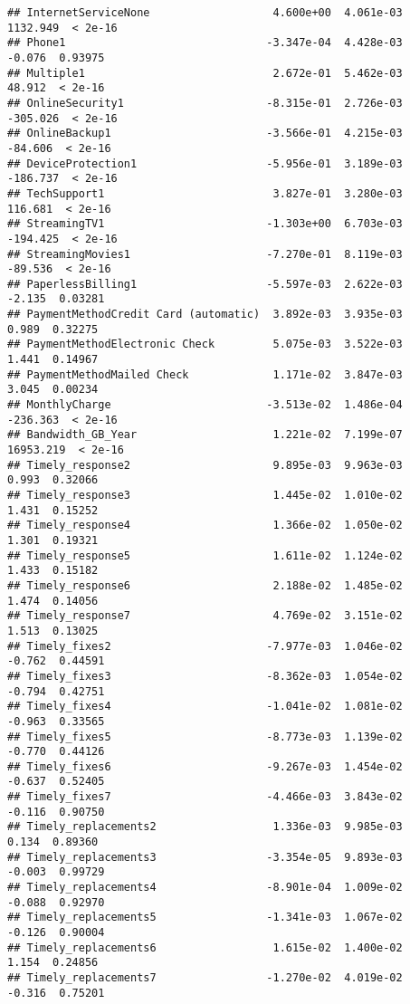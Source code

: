 \documentclass[
]{article}
\begin{document}
\begin{verbatim}
## InternetServiceNone                   4.600e+00  4.061e-03  1132.949  < 2e-16
## Phone1                               -3.347e-04  4.428e-03    -0.076  0.93975
## Multiple1                             2.672e-01  5.462e-03    48.912  < 2e-16
## OnlineSecurity1                      -8.315e-01  2.726e-03  -305.026  < 2e-16
## OnlineBackup1                        -3.566e-01  4.215e-03   -84.606  < 2e-16
## DeviceProtection1                    -5.956e-01  3.189e-03  -186.737  < 2e-16
## TechSupport1                          3.827e-01  3.280e-03   116.681  < 2e-16
## StreamingTV1                         -1.303e+00  6.703e-03  -194.425  < 2e-16
## StreamingMovies1                     -7.270e-01  8.119e-03   -89.536  < 2e-16
## PaperlessBilling1                    -5.597e-03  2.622e-03    -2.135  0.03281
## PaymentMethodCredit Card (automatic)  3.892e-03  3.935e-03     0.989  0.32275
## PaymentMethodElectronic Check         5.075e-03  3.522e-03     1.441  0.14967
## PaymentMethodMailed Check             1.171e-02  3.847e-03     3.045  0.00234
## MonthlyCharge                        -3.513e-02  1.486e-04  -236.363  < 2e-16
## Bandwidth_GB_Year                     1.221e-02  7.199e-07 16953.219  < 2e-16
## Timely_response2                      9.895e-03  9.963e-03     0.993  0.32066
## Timely_response3                      1.445e-02  1.010e-02     1.431  0.15252
## Timely_response4                      1.366e-02  1.050e-02     1.301  0.19321
## Timely_response5                      1.611e-02  1.124e-02     1.433  0.15182
## Timely_response6                      2.188e-02  1.485e-02     1.474  0.14056
## Timely_response7                      4.769e-02  3.151e-02     1.513  0.13025
## Timely_fixes2                        -7.977e-03  1.046e-02    -0.762  0.44591
## Timely_fixes3                        -8.362e-03  1.054e-02    -0.794  0.42751
## Timely_fixes4                        -1.041e-02  1.081e-02    -0.963  0.33565
## Timely_fixes5                        -8.773e-03  1.139e-02    -0.770  0.44126
## Timely_fixes6                        -9.267e-03  1.454e-02    -0.637  0.52405
## Timely_fixes7                        -4.466e-03  3.843e-02    -0.116  0.90750
## Timely_replacements2                  1.336e-03  9.985e-03     0.134  0.89360
## Timely_replacements3                 -3.354e-05  9.893e-03    -0.003  0.99729
## Timely_replacements4                 -8.901e-04  1.009e-02    -0.088  0.92970
## Timely_replacements5                 -1.341e-03  1.067e-02    -0.126  0.90004
## Timely_replacements6                  1.615e-02  1.400e-02     1.154  0.24856
## Timely_replacements7                 -1.270e-02  4.019e-02    -0.316  0.75201

\end{verbatim}
\end{document}
